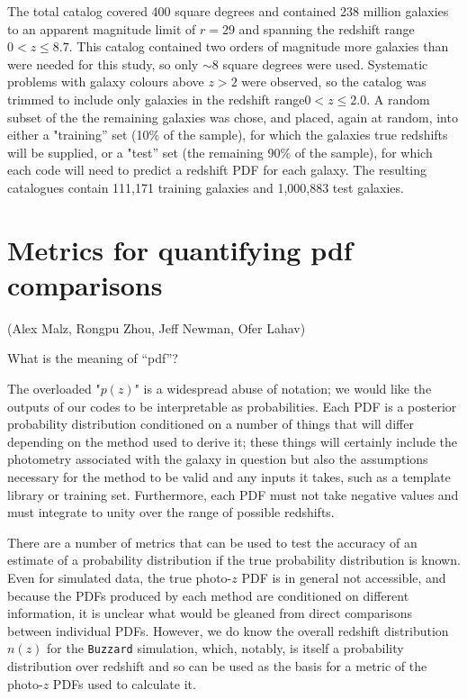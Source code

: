 \documentclass[usenatbib]{mn2e}
\begin{document}
The total catalog covered 400 square degrees and contained 238 million galaxies to an apparent magnitude limit of $r\!=\!29$ and spanning the redshift range $0\!<\!z\!\leq\!8.7$.  This catalog contained two orders of magnitude more galaxies than were needed for this study, so only $\sim\!8$ square degrees were used.  Systematic problems with galaxy colours above $z\!>\!2$ were observed, so the catalog was trimmed to include only galaxies in the redshift range$0\!<\!z\!\leq\!2.0$.  A random subset of the the remaining galaxies was chose, and placed, again at random, into either a "training'' set (10\% of the sample), for which the galaxies true redshifts will be supplied, or a "test'' set (the remaining 90\% of the sample), for which each code will need to predict a redshift PDF for each galaxy. The resulting catalogues contain 111,171 training galaxies and 1,000,883 test galaxies.



\section{Metrics for quantifying pdf comparisons}\label{metrics}

(Alex Malz, Rongpu Zhou, Jeff Newman, Ofer Lahav)

What is the meaning of “pdf”? 

The overloaded "$p(z)$" is a widespread abuse of notation; we would like the outputs of our codes to be interpretable as probabilities.  Each PDF is a posterior probability distribution conditioned on a number of things that will differ depending on the method used to derive it; these things will certainly include the photometry associated with the galaxy in question but also the assumptions necessary for the method to be valid and any inputs it takes, such as a template library or training set.  Furthermore, each PDF must not take negative values and must integrate to unity over the range of possible redshifts.

There are a number of metrics that can be used to test the accuracy of an estimate of a probability distribution if the true probability distribution is known.  Even for simulated data, the true photo-$z$ PDF is in general not accessible, and because the PDFs produced by each method are conditioned on different information, it is unclear what would be gleaned from direct comparisons between individual PDFs.  However, we do know the overall redshift distribution $n(z)$ for the \texttt{Buzzard} simulation, which, notably, is itself a probability distribution over redshift and so can be used as the basis for a metric of the photo-$z$ PDFs used to calculate it.  
\end{document}
